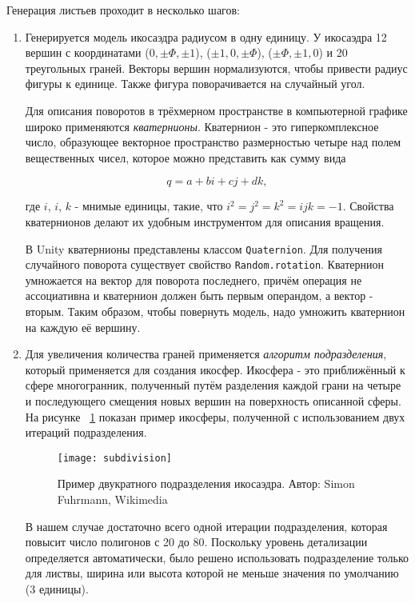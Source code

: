 Генерация листьев проходит в несколько шагов:
\begin{enumerate}
\item Генерируется модель икосаэдра радиусом в одну единицу. У икосаэдра 12 вершин с координатами 
(\texttt{\(0, \pm\Phi, \pm1\)}), 
(\texttt{\(\pm1, 0, \pm\Phi\)}), 
(\texttt{\(\pm\Phi, \pm1, 0\)}) и 20 треугольных граней.\cite{IcosahedronMath}
Векторы вершин нормализуются, чтобы привести радиус фигуры к единице. Также фигура поворачивается на случайный угол.

Для описания поворотов в трёхмерном пространстве в компьютерной графике широко применяются \emph{кватернионы}. Кватернион - это гиперкомплексное число, образующее векторное пространство размерностью четыре над полем вещественных чисел, которое можно представить как сумму вида

\begin{equation}
    q = a + bi + cj + dk,
\end{equation}

где $i$, $i$, $k$ - мнимые единицы, такие, что $i^2 = j^2 = k^2 = ijk = -1$. Свойства кватернионов делают их удобным инструментом для описания вращения\cite{quaternions}.

В Unity кватернионы представлены классом \texttt{Quaternion}. Для получения случайного поворота существует свойство \texttt{Random.rotation}. Кватернион умножается на вектор для поворота последнего, причём операция не ассоциативна и кватернион должен быть первым операндом, а вектор - вторым. Таким образом, чтобы повернуть модель, надо умножить кватернион на каждую её вершину.

\item Для увеличения количества граней применяется \emph{алгоритм подразделения}\cite{Subdivision}, который применяется для создания икосфер. Икосфера - это приближённый к сфере многогранник, полученный путём разделения каждой грани на четыре и последующего смещения новых вершин на поверхность описанной сферы. На рисунке ~\ref{fig:subdivision} показан пример икосферы, полученной с использованием двух итераций подразделения.
 
\begin{figure}[h]
    \centering
    \texttt{[image: subdivision]}
    \caption{Пример двукратного подразделения икосаэдра. Автор: Simon Fuhrmann, Wikimedia}
    \label{fig:subdivision}
\end{figure}

В нашем случае достаточно всего одной итерации подразделения, которая повысит число полигонов с 20 до 80. Поскольку уровень детализации определяется автоматически, было решено использовать подразделение только для листвы, ширина или высота которой не меньше значения по умолчанию (3 единицы).


\end{enumerate}
